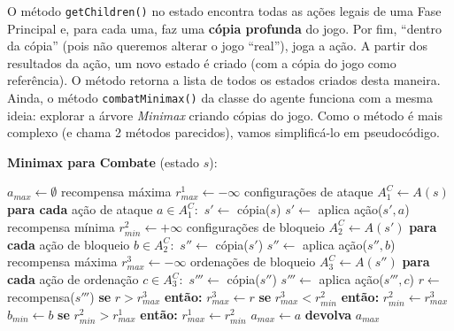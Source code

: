 

O método \texttt{getChildren()} no estado encontra todas as ações legais de uma Fase Principal e, para cada uma, faz uma \textbf{cópia profunda} do jogo. Por fim,  ``dentro da cópia'' (pois não queremos alterar o jogo ``real''), joga a ação. A partir dos resultados da ação, um novo estado é criado (com a cópia do jogo como referência). O método retorna a lista de todos os estados criados desta maneira. Ainda, o método \texttt{combatMinimax()} da classe do agente funciona com a mesma ideia: explorar a árvore \textit{Minimax} criando cópias do jogo. Como o método é mais complexo (e chama 2 métodos parecidos), vamos simplificá-lo em pseudocódigo.

\begin{algorithm}
\caption*{\textbf{Minimax para Combate} (estado $s$):}
\begin{algorithmic}
  \STATE $a_{max} \gets \emptyset$
  \STATE recompensa máxima $r^1_{max} \gets -\infty$
  \STATE configurações de ataque $A^C_1 \gets A(s)$
  \STATE \textbf{para cada} ação de ataque $a \in A^C_1:$
    \STATE \ind $s' \gets $ cópia($s$)
    \STATE \ind $s' \gets $ aplica ação($s', a$)
    \STATE \ind recompensa mínima $r^2_{min} \gets +\infty$
    \STATE \ind configurações de bloqueio $A^C_2 \gets A(s')$
    \STATE
    \STATE \ind \textbf{para cada} ação de bloqueio $b \in A^C_2:$
      \STATE \ind \ind $s'' \gets $ cópia($s'$)
      \STATE \ind \ind $s'' \gets $ aplica ação($s'', b$)
      \STATE \ind \ind recompensa máxima $r^3_{max} \gets -\infty$
      \STATE \ind \ind ordenações de bloqueio $A^C_3 \gets A(s'')$
      \STATE
      \STATE \ind \ind \textbf{para cada} ação de ordenação $c \in A^C_3:$
        \STATE \ind \ind \ind $s'''\gets $ cópia($s''$)
        \STATE \ind \ind \ind $s'''\gets $ aplica ação($s''', c$)
        \STATE \ind \ind \ind $r \gets $ recompensa($s'''$)
        \STATE \ind \ind \ind \textbf{se } $r > r^3_{max}$ \textbf{então: }
        \STATE \ind \ind \ind \ind $r^3_{max} \gets r$
      \STATE
      \STATE \ind \ind \textbf{se } $r^3_{max} < r^2_{min}$ \textbf{então: }
      \STATE \ind \ind \ind $r^2_{min} \gets r^3_{max}$
      \STATE \ind \ind \ind $b_{min} \gets b$
    \STATE
    \STATE \ind \textbf{se } $r^2_{min} > r^1_{max}$ \textbf{então: }
    \STATE \ind \ind $r^1_{max} \gets r^2_{min}$
    \STATE \ind \ind $a_{max} \gets a$
    \STATE
    \STATE \textbf{devolva } $a_{max}$
\end{algorithmic}
\end{algorithm}
